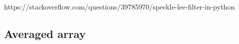 \documentclass[11pt]{article}
\begin{document}
    \begin{center}
    \end{center}
    { \hspace*{\fill} \\}
    
    \begin{center}
    \end{center}
    { \hspace*{\fill} \\}
    
    \begin{center}
    \end{center}
    { \hspace*{\fill} \\}
    
    \begin{center}
    \end{center}
    { \hspace*{\fill} \\}
    
    \begin{center}
    \end{center}
    { \hspace*{\fill} \\}
    
    https://stackoverflow.com/questions/39785970/speckle-lee-filter-in-python

    \hypertarget{averaged-array}{%
\subsection{Averaged array}\label{averaged-array}}
\end{document}
